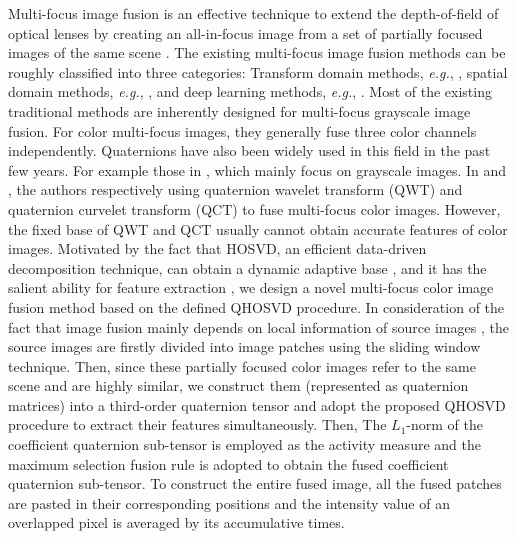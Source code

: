 \documentclass[journal]{IEEEtran}
\begin{document}
Multi-focus image fusion is an effective technique to extend the depth-of-field of optical lenses by creating an all-in-focus image from a set of partially focused images of the same scene \cite{DBLP:journals/inffus/LiuWCLC20}. The existing multi-focus image fusion methods can be roughly  classified into three categories: Transform domain methods, \emph{e.g.}, \cite{DBLP:journals/cvgip/LiMM95, 2007Image, DBLP:journals/inffus/ZhouLW14, DBLP:journals/tip/LiKH13, DBLP:journals/tip/LiangHLZ12}, spatial domain methods, \emph{e.g.}, \cite{DBLP:journals/inffus/BaiZZX15, DBLP:journals/spic/QiuLZY19, DBLP:journals/jei/ZhanKLH19}, and deep learning
methods, \emph{e.g.}, \cite{DBLP:journals/inffus/LiuCPW17, DBLP:journals/access/LaiLGX19}. Most of the existing traditional methods are inherently designed for multi-focus grayscale image fusion. For color multi-focus images, they generally fuse three color channels independently. Quaternions have also been widely used in this field in the past few years. For example those in \cite{DBLP:journals/sigpro/LiuJWSD14,DBLP:journals/access/ChaiLZ17,DBLP:journals/jei/LiuJWSD13}, which mainly focus on grayscale images. In \cite{2013Multifocus} and \cite{2012Multifocus}, the authors respectively using quaternion wavelet
transform (QWT) and quaternion curvelet transform (QCT) to fuse multi-focus color images. However, the fixed base of QWT and QCT usually cannot obtain accurate features of color images. Motivated by the fact that HOSVD, an efficient data-driven decomposition technique, can obtain a dynamic adaptive base \cite{DBLP:journals/access/GaoGZCZ19}, and it has the salient ability for feature extraction \cite{DBLP:journals/jvcir/LuoZZW17}, we design a novel multi-focus color image fusion method based on the defined QHOSVD procedure. In consideration of the fact that image fusion mainly depends on local information of source images \cite{DBLP:journals/jvcir/LuoZZW17}, the source images are firstly divided into image patches using the sliding window technique. Then, since these partially focused color images refer to the same scene and are highly similar, we construct them (represented as quaternion matrices) into a third-order quaternion tensor \cite{DBLP:journals/pr/MiaoKL20} and adopt the proposed QHOSVD procedure to extract their features simultaneously. Then, The $L_{1}$-norm of the coefficient quaternion sub-tensor is employed as the activity measure and the maximum selection fusion rule is adopted to obtain the fused  coefficient quaternion sub-tensor. To construct the entire fused image, all the fused patches are pasted in their corresponding positions and the intensity value of an overlapped pixel is averaged by its accumulative times. 
\end{document}
